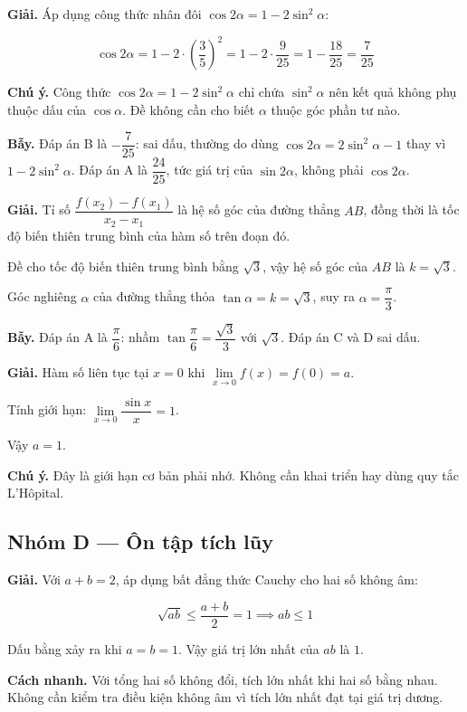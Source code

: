 \documentclass[11pt, a4paper]{article}
\begin{document}
\begin{dapan}[20 — Đáp án D]
\textbf{Giải.} Áp dụng công thức nhân đôi $\cos 2\alpha = 1 - 2\sin^2\alpha$:

$$\cos 2\alpha = 1 - 2 \cdot \left(\frac{3}{5}\right)^2 = 1 - 2 \cdot \frac{9}{25} = 1 - \frac{18}{25} = \frac{7}{25}$$

\textbf{Chú ý.} Công thức $\cos 2\alpha = 1 - 2\sin^2\alpha$ chỉ chứa $\sin^2\alpha$ nên kết quả không phụ thuộc dấu của $\cos\alpha$. Đề không cần cho biết $\alpha$ thuộc góc phần tư nào.

\textbf{Bẫy.} Đáp án B là $-\dfrac{7}{25}$: sai dấu, thường do dùng $\cos 2\alpha = 2\sin^2\alpha - 1$ thay vì $1 - 2\sin^2\alpha$. Đáp án A là $\dfrac{24}{25}$, tức giá trị của $\sin 2\alpha$, không phải $\cos 2\alpha$.
\end{dapan}

\begin{dapan}[21 — Đáp án B]
\textbf{Giải.} Tỉ số $\dfrac{f(x_2) - f(x_1)}{x_2 - x_1}$ là hệ số góc của đường thẳng $AB$, đồng thời là tốc độ biến thiên trung bình của hàm số trên đoạn đó.

Đề cho tốc độ biến thiên trung bình bằng $\sqrt{3}$, vậy hệ số góc của $AB$ là $k = \sqrt{3}$.

Góc nghiêng $\alpha$ của đường thẳng thỏa $\tan\alpha = k = \sqrt{3}$, suy ra $\alpha = \dfrac{\pi}{3}$.

\textbf{Bẫy.} Đáp án A là $\dfrac{\pi}{6}$: nhầm $\tan\dfrac{\pi}{6} = \dfrac{\sqrt{3}}{3}$ với $\sqrt{3}$. Đáp án C và D sai dấu.
\end{dapan}

\begin{dapan}[22 — Đáp án C]
\textbf{Giải.} Hàm số liên tục tại $x = 0$ khi $\lim\limits_{x \to 0} f(x) = f(0) = a$.

Tính giới hạn: $\lim\limits_{x \to 0} \dfrac{\sin x}{x} = 1$.

Vậy $a = 1$.

\textbf{Chú ý.} Đây là giới hạn cơ bản phải nhớ. Không cần khai triển hay dùng quy tắc L'Hôpital.
\end{dapan}

\subsection*{Nhóm D — Ôn tập tích lũy}

\begin{dapan}[23 — Đáp án A]
\textbf{Giải.} Với $a + b = 2$, áp dụng bất đẳng thức Cauchy cho hai số không âm:

$$\sqrt{ab} \le \frac{a+b}{2} = 1 \implies ab \le 1$$

Dấu bằng xảy ra khi $a = b = 1$. Vậy giá trị lớn nhất của $ab$ là $1$.

\textbf{Cách nhanh.} Với tổng hai số không đổi, tích lớn nhất khi hai số bằng nhau. Không cần kiểm tra điều kiện không âm vì tích lớn nhất đạt tại giá trị dương.
\end{dapan}
\end{document}
